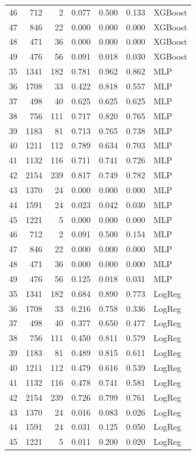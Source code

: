 \begin{tabular}{rrrrrrl}
46 & 712 & 2 & 0.077 & 0.500 & 0.133 & XGBoost \\
47 & 846 & 22 & 0.000 & 0.000 & 0.000 & XGBoost \\
48 & 471 & 36 & 0.000 & 0.000 & 0.000 & XGBoost \\
49 & 476 & 56 & 0.091 & 0.018 & 0.030 & XGBoost \\
35 & 1341 & 182 & 0.781 & 0.962 & 0.862 & MLP \\
36 & 1708 & 33 & 0.422 & 0.818 & 0.557 & MLP \\
37 & 498 & 40 & 0.625 & 0.625 & 0.625 & MLP \\
38 & 756 & 111 & 0.717 & 0.820 & 0.765 & MLP \\
39 & 1183 & 81 & 0.713 & 0.765 & 0.738 & MLP \\
40 & 1211 & 112 & 0.789 & 0.634 & 0.703 & MLP \\
41 & 1132 & 116 & 0.711 & 0.741 & 0.726 & MLP \\
42 & 2154 & 239 & 0.817 & 0.749 & 0.782 & MLP \\
43 & 1370 & 24 & 0.000 & 0.000 & 0.000 & MLP \\
44 & 1591 & 24 & 0.023 & 0.042 & 0.030 & MLP \\
45 & 1221 & 5 & 0.000 & 0.000 & 0.000 & MLP \\
46 & 712 & 2 & 0.091 & 0.500 & 0.154 & MLP \\
47 & 846 & 22 & 0.000 & 0.000 & 0.000 & MLP \\
48 & 471 & 36 & 0.000 & 0.000 & 0.000 & MLP \\
49 & 476 & 56 & 0.125 & 0.018 & 0.031 & MLP \\
35 & 1341 & 182 & 0.684 & 0.890 & 0.773 & LogReg \\
36 & 1708 & 33 & 0.216 & 0.758 & 0.336 & LogReg \\
37 & 498 & 40 & 0.377 & 0.650 & 0.477 & LogReg \\
38 & 756 & 111 & 0.450 & 0.811 & 0.579 & LogReg \\
39 & 1183 & 81 & 0.489 & 0.815 & 0.611 & LogReg \\
40 & 1211 & 112 & 0.479 & 0.616 & 0.539 & LogReg \\
41 & 1132 & 116 & 0.478 & 0.741 & 0.581 & LogReg \\
42 & 2154 & 239 & 0.726 & 0.799 & 0.761 & LogReg \\
43 & 1370 & 24 & 0.016 & 0.083 & 0.026 & LogReg \\
44 & 1591 & 24 & 0.031 & 0.125 & 0.050 & LogReg \\
45 & 1221 & 5 & 0.011 & 0.200 & 0.020 & LogReg \\

\end{tabular}
